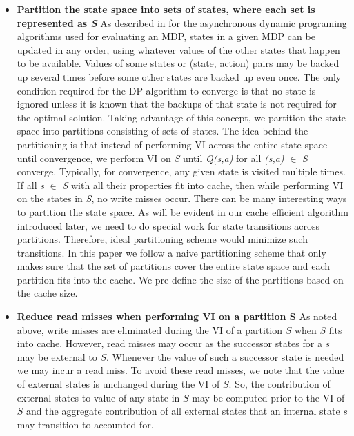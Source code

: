 \documentclass[conference]{IEEEtran}
\begin{document}
\begin{itemize}
\item \textbf{Partition the state space into sets of states, where each set is represented as \textit{S}} As described in \cite{suttonbook} for the asynchronous dynamic programing algorithms used for evaluating an MDP, states in a given MDP can be updated in any order, using whatever values of the other states that happen to be available. Values of some states or (state, action) pairs may be backed up several times before some other states are backed up even once. The only condition required for the DP algorithm to converge is that no state is ignored unless it is known that the backups of that state is not required for the optimal solution. Taking advantage of this concept, we partition the state space into partitions consisting of sets of states. The idea behind the partitioning is that instead of performing VI across the entire state space until convergence, we perform VI on \textit{S} until \textit{Q(s,a)} for all \textit{(s,a)} $\in$ \textit{S} converge. Typically, for convergence, any given state is visited multiple times. If all \textit{s} $\in$ \textit{S} with all their properties fit into cache, then while performing VI on the states in \textit{S}, no write misses occur. There can be many interesting ways to partition the state space. As will be evident in our cache efficient algorithm introduced later, we need to do special work for state transitions across partitions. Therefore, ideal partitioning scheme would minimize such transitions. In this paper we follow a naive partitioning scheme that only makes sure that the set of partitions cover the entire state space and each partition fits into the cache. We pre-define the size of the partitions based on the cache size.

\item \textbf{Reduce read misses when performing VI on a partition S} As noted above, write misses are eliminated during the VI of a partition $S$ when $S$ fits into cache. However, read misses may occur as the successor states for a $s$
may be external to $S$. Whenever the value of such a successor state is needed we may incur a read miss. To avoid these read misses, we note that the value of external states is unchanged during the VI of $S$. So, the contribution of external states to value of any state in $S$ may be computed prior to the VI of $S$ and the
aggregate contribution of all external states that an internal state $s$ may transition to accounted for.
\end{itemize}
\end{document}

